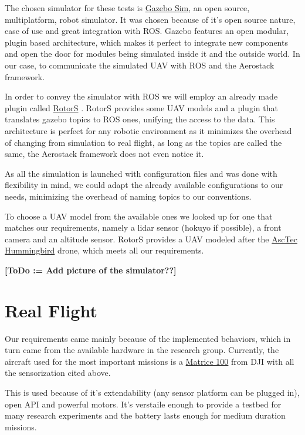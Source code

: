   The chosen simulator for these tests is \href{http://gazebosim.org/}{Gazebo Sim}, an open source, multiplatform, robot simulator. It was chosen because of it's open source nature, ease of use and great integration with ROS. Gazebo features an open modular, plugin based architecture, which makes it perfect to integrate new components and open the door for modules being simulated inside it and the outside world. In our case, to communicate the simulated UAV with ROS and the Aerostack framework.

  In order to convey the simulator with ROS we will employ an already made plugin called \href{https://github.com/ethz-asl/rotors_simulator/wiki}{RotorS} \cite{rotors2016}. RotorS provides some UAV models and a plugin that translates gazebo topics to ROS ones, unifying the access to the data. This architecture is perfect for any robotic environment as it minimizes the overhead of changing from simulation to real flight, as long as the topics are called the same, the Aerostack framework does not even notice it.

  As all the simulation is launched with configuration files and was done with flexibility in mind, we could adapt the already available configurations to our needs, minimizing the overhead of naming topics to our conventions.

  To choose a UAV model from the available ones we looked up for one that matches our requirements, namely a lidar sensor (hokuyo if possible), a front camera and an altitude sensor. RotorS provides a UAV modeled after the \href{http://www.asctec.de/en/uav-uas-drones-rpas-roav/asctec-hummingbird/}{AscTec Hummingbird} drone, which meets all our requirements.

  \textbf{[ToDo := Add picture of the simulator??]}

\section{Real Flight} \label{ch_5:sect:real_flight}

  Our requirements came mainly because of the implemented behaviors, which in turn came from the available hardware in the research group. Currently, the aircraft used for the most important missions is a \href{https://www.dji.com/es/matrice100}{Matrice 100} from DJI with all the sensorization cited above.

  This is used because of it's extendability (any sensor platform can be plugged in), open API and powerful motors. It's verstaile enough to provide a testbed for many research experiments and the battery lasts enough for medium duration missions.

